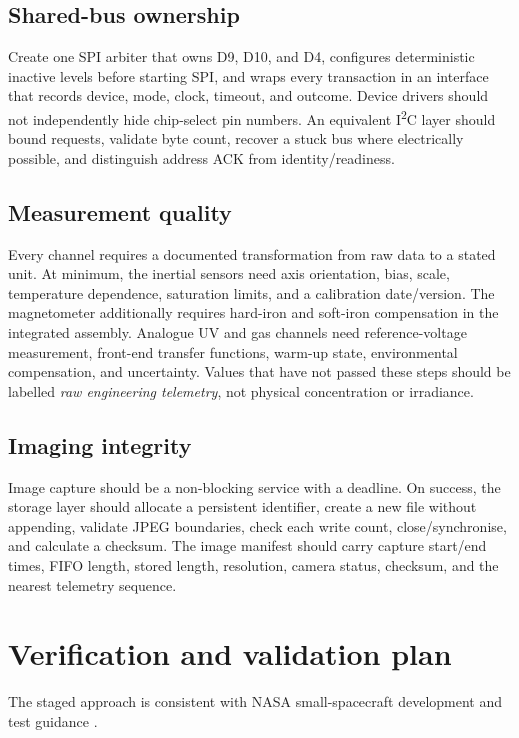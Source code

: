 \documentclass[11pt,a4paper]{article}
\begin{document}
\subsection{Shared-bus ownership}

Create one SPI arbiter that owns D9, D10, and D4, configures deterministic inactive levels before starting SPI, and wraps every transaction in an interface that records device, mode, clock, timeout, and outcome. Device drivers should not independently hide chip-select pin numbers. An equivalent I\textsuperscript{2}C layer should bound requests, validate byte count, recover a stuck bus where electrically possible, and distinguish address ACK from identity/readiness.

\subsection{Measurement quality}

Every channel requires a documented transformation from raw data to a stated unit. At minimum, the inertial sensors need axis orientation, bias, scale, temperature dependence, saturation limits, and a calibration date/version. The magnetometer additionally requires hard-iron and soft-iron compensation in the integrated assembly. Analogue UV and gas channels need reference-voltage measurement, front-end transfer functions, warm-up state, environmental compensation, and uncertainty. Values that have not passed these steps should be labelled \emph{raw engineering telemetry}, not physical concentration or irradiance.

\subsection{Imaging integrity}

Image capture should be a non-blocking service with a deadline. On success, the storage layer should allocate a persistent identifier, create a new file without appending, validate JPEG boundaries, check each write count, close/synchronise, and calculate a checksum. The image manifest should carry capture start/end times, FIFO length, stored length, resolution, camera status, checksum, and the nearest telemetry sequence.

\section{Verification and validation plan}

The staged approach is consistent with NASA small-spacecraft development and test guidance \cite{nasa}.
\end{document}
